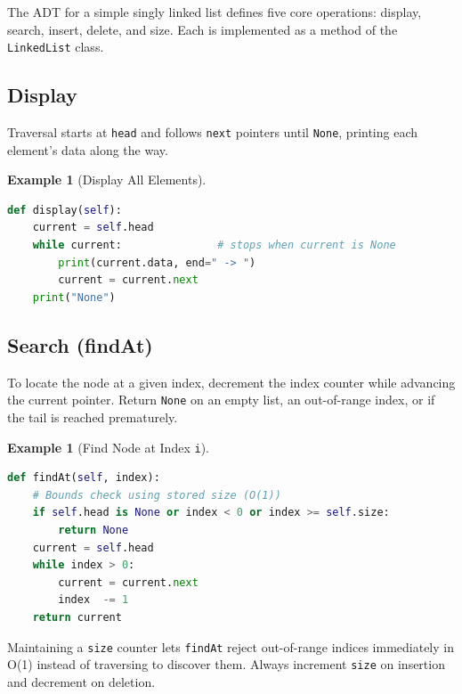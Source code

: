 \documentclass[11pt, a4paper, notitlepage]{report}
\theoremstyle{definition}
\theoremstyle{remark}
\theoremstyle{definition}
\newtheorem{example}[theorem]{Example}
\begin{document}
The ADT for a simple singly linked list defines five core operations: display,
search, insert, delete, and size. Each is implemented as a method of the
\texttt{LinkedList} class.

\subsection{Display}
\label{subsec:ll-display}

Traversal starts at \texttt{head} and follows \texttt{next} pointers until
\texttt{None}, printing each element's data along the way.

\begin{example}[Display All Elements]
\leavevmode
\begin{lstlisting}[language=Python]
def display(self):
    current = self.head
    while current:               # stops when current is None
        print(current.data, end=" -> ")
        current = current.next
    print("None")
\end{lstlisting}
\end{example}

\subsection{Search (findAt)}
\label{subsec:ll-search}

To locate the node at a given index, decrement the index counter while
advancing the current pointer. Return \texttt{None} on an empty list, an
out-of-range index, or if the tail is reached prematurely.

\begin{example}[Find Node at Index \texttt{i}]
\leavevmode
\begin{lstlisting}[language=Python]
def findAt(self, index):
    # Bounds check using stored size (O(1))
    if self.head is None or index < 0 or index >= self.size:
        return None
    current = self.head
    while index > 0:
        current = current.next
        index  -= 1
    return current
\end{lstlisting}
\end{example}

\begin{examtip}[title={Exam Tip: Storing \texttt{size} Avoids Repeated Traversal}]
Maintaining a \texttt{size} counter lets \texttt{findAt} reject out-of-range
indices immediately in O(1) instead of traversing to discover them. Always
increment \texttt{size} on insertion and decrement on deletion.
\end{examtip}
\end{document}

